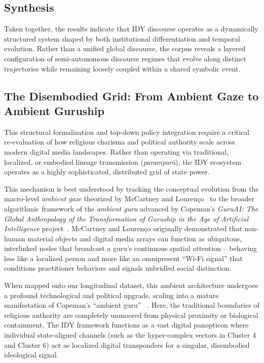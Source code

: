 \documentclass[11pt]{article}
\begin{document}
\subsection{Synthesis}

Taken together, the results indicate that IDY discourse operates as a dynamically structured system shaped by both institutional differentiation and temporal evolution. Rather than a unified global discourse, the corpus reveals a layered configuration of semi-autonomous discourse regimes that evolve along distinct trajectories while remaining loosely coupled within a shared symbolic event.

\subsection{The Disembodied Grid: From Ambient Gaze to Ambient Guruship}
This structural formalization and top-down policy integration require a critical re-evaluation of how religious charisma and political authority scale across modern digital media landscapes. Rather than operating via traditional, localized, or embodied lineage transmission (\textit{parampar\={a}}), the IDY ecosystem operates as a highly sophisticated, distributed grid of state power.

This mechanism is best understood by tracking the conceptual evolution from the macro-level \textit{ambient gaze} theorized by McCartney and Louren\c{c}o~\cite{mccartney2023} to the broader algorithmic framework of the \textit{ambient guru} advanced by Copeman's \textit{GuruAI: The Global Anthropology of the Transformation of Guruship in the Age of Artificial Intelligence} project~\cite{copeman2023,idega2026}. McCartney and Louren\c{c}o originally demonstrated that non-human material objects and digital media arrays can function as ubiquitous, interlinked nodes that broadcast a guru's continuous spatial attention -- behaving less like a localized person and more like an omnipresent ``Wi-Fi signal'' that conditions practitioner behaviors and signals unbridled social distinction.

When mapped onto our longitudinal dataset, this ambient architecture undergoes a profound technological and political upgrade, scaling into a mature manifestation of Copeman’s ``ambient guru'' ~\cite{copeman2012,idega2026}. Here, the traditional boundaries of religious authority are completely unmoored from physical proximity or biological containment. The IDY framework functions as a vast digital panopticon where individual state-aligned channels (such as the hyper-complex vectors in Cluster 4 and Cluster 6) act as localized digital transponders for a singular, disembodied ideological signal. 
\end{document}
